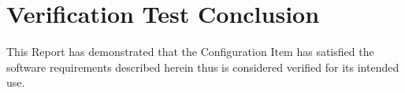 \newpage
\section{Verification Test Conclusion}
This Report has demonstrated that the Configuration Item has satisfied the
software requirements described herein thus is considered verified for its
intended use.
